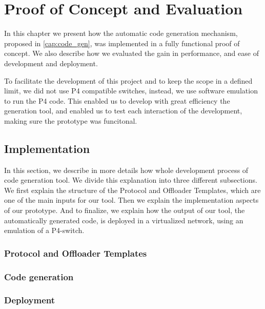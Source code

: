 \chapter{Proof of Concept and Evaluation}
\label{cap:evaluation}


In this chapter we present how the automatic code generation mechanism, proposed in \autoref{cap:code_gen}, was implemented in a fully functional proof of concept. We also describe how we evaluated the gain in performance, and ease of development and deployment.

To facilitate the development of this project and to keep the scope in a defined limit, we did not use P4 compatible switches, instead, we use software emulation to run the P4 code. This enabled us to develop with great efficiency the generation tool, and enabled us to test each interaction of the development, making sure the prototype was funcitonal.


\section{Implementation}
\label{sec:evaluation:implementation}

In this section, we describe in more details how whole development process of code generation tool. We divide this explanation into three different subsections. We first explain the structure of the Protocol and Offloader Templates, which are one of the main inputs for our tool. Then we explain the implementation aspects of our prototype. And to finalize, we explain how the output of our tool, the automatically generated code, is deployed in a virtualized network, using an emulation of a P4-switch.


\subsection{Protocol and Offloader Templates}


\subsection{Code generation}


\subsection{Deployment}



